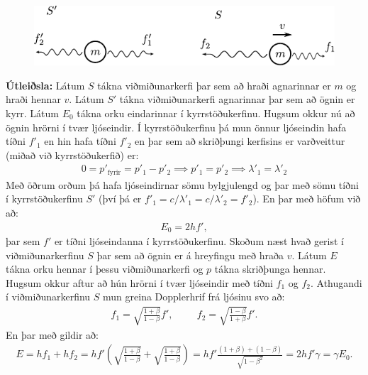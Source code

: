 \ifdefined \wholebook \else\documentclass[oneside]{book}\usepackage{EdlBook}\graphicspath{{figures/}}
\begin{document}
\begin{figure}[H]
    \centering
    \includegraphics{figures/ljoseind-hrorna.pdf}
\end{figure}


\textbf{Útleiðsla:} Látum $S$ tákna viðmiðunarkerfi þar sem að hraði agnarinnar er $m$ og hraði hennar $v$. Látum $S'$ tákna viðmiðunarkerfi agnarinnar þar sem að ögnin er kyrr. Látum $E_0$ tákna orku eindarinnar í kyrrstöðukerfinu. Hugsum okkur nú að ögnin hrörni í tvær ljóseindir. Í kyrrstöðukerfinu þá mun önnur ljóseindin hafa tíðni $f'_1$ en hin hafa tíðni $f'_2$ en þar sem að skriðþungi kerfisins er varðveittur (miðað við kyrrstöðukerfið) er:
\begin{align*}
   0 = p'_{\text{fyrir}} = p'_1 - p'_2 \implies p'_1 = p'_2 \implies \lambda'_1 = \lambda'_2
\end{align*}
Með öðrum orðum þá hafa ljóseindirnar sömu bylgjulengd og þar með sömu tíðni í kyrrstöðukerfinu $S'$ (því þá er $f'_1 = c/\lambda'_1 = c/\lambda'_2 = f'_2$). En þar með höfum við að:
\begin{align*}
    E_0 = 2hf',
\end{align*}
þar sem $f'$ er tíðni ljóseindanna í kyrrstöðukerfinu. Skoðum næst hvað gerist í viðmiðunarkerfinu $S$ þar sem að ögnin er á hreyfingu með hraða $v$. Látum $E$ tákna orku hennar í þessu viðmiðunarkerfi og $p$ tákna skriðþunga hennar. Hugsum okkur aftur að hún hrörni í tvær ljóseindir með tíðni $f_1$ og $f_2$. Athugandi í viðmiðunarkerfinu $S$ mun greina Dopplerhrif frá ljósinu svo að:
\begin{align*}
    f_1 = \sqrt{\frac{1+\beta}{1-\beta}}f', \hspace{1cm} f_2 = \sqrt{\frac{1-\beta}{1+\beta}}f'.
\end{align*}
En þar með gildir að:
\begin{align*}
    E = hf_1 + hf_2 = hf' \left( \sqrt{\frac{1+\beta}{1-\beta}} + \sqrt{\frac{1+\beta}{1-\beta}}  \right) = hf' \frac{(1 + \beta) + (1-\beta)}{\sqrt{1-\beta^2}} = 2hf' \gamma = \gamma E_0.
\end{align*}
\end{document}
